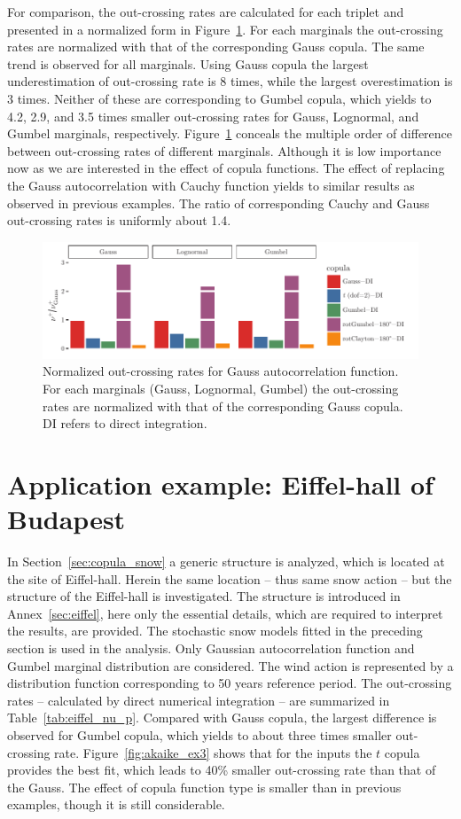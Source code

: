 For comparison, the out-crossing rates are calculated for each triplet and presented in a normalized form in Figure~\ref{fig:norm_nu_ex3}. For each marginals the out-crossing rates are normalized with that of the corresponding Gauss copula. The same trend is observed for all marginals. Using Gauss copula the largest underestimation of out-crossing rate is 8 times, while the largest overestimation is 3 times. Neither of these are corresponding to Gumbel copula, which yields to 4.2, 2.9, and 3.5 times smaller out-crossing rates for Gauss, Lognormal, and Gumbel marginals, respectively. Figure~\ref{fig:norm_nu_ex3} conceals the multiple order of difference between out-crossing rates of different marginals. Although it is low importance now as we are interested in the effect of copula functions. The effect of replacing the Gauss autocorrelation with Cauchy function yields to similar results as observed in previous examples. The ratio of corresponding Cauchy and Gauss out-crossing rates is uniformly about 1.4.

\begin{figure}[htbp!] 
	\centering    
	\includegraphics[]{normalized_nu_p.pdf}
	\caption{Normalized out-crossing rates for Gauss autocorrelation function. For each marginals (Gauss, Lognormal, Gumbel) the out-crossing rates are normalized with that of the corresponding Gauss copula. DI refers to direct integration.}
	\label{fig:norm_nu_ex3}
\end{figure}

\section{Application example: Eiffel-hall of Budapest}
In Section~\ref{sec:copula_snow} a generic structure is analyzed, which is located at the site of Eiffel-hall. Herein the same location -- thus same snow action -- but the structure of the Eiffel-hall is investigated. The structure is introduced in Annex~\ref{sec:eiffel}, here only the essential details, which are required to interpret the results, are provided. The stochastic snow models fitted in the preceding section is used in the analysis. Only Gaussian autocorrelation function and Gumbel marginal distribution are considered. The wind action is represented by a distribution function corresponding to 50 years reference period. The out-crossing rates -- calculated by direct numerical integration -- are summarized in Table~\ref{tab:eiffel_nu_p}. Compared with Gauss copula, the largest difference is observed for Gumbel copula, which yields to about three times smaller out-crossing rate. Figure~\ref{fig:akaike_ex3} shows that for the inputs the $t$ copula provides the best fit, which leads to 40\% smaller out-crossing rate than that of the Gauss. The effect of copula function type is smaller than in previous examples, though it is still considerable.

